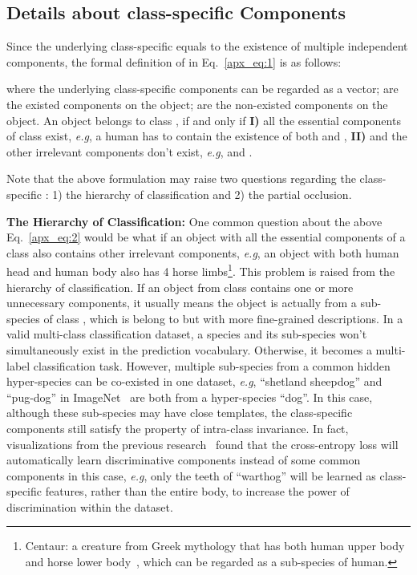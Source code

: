 \documentclass{article}
\def\eg{\emph{e.g}} \def\Eg{\emph{E.g}}
\begin{document}
\subsection{Details about class-specific Components}

Since the underlying class-specific  equals to the existence of multiple independent components, the formal definition of  in Eq.~\eqref{apx_eq:1} is as follows:

where the underlying class-specific components  can be regarded as a  vector;  are the existed components on the object;  are the non-existed components on the object. An object  belongs to class , if and only if \textbf{I)} all the essential components of class  exist, \eg, a human has to contain the existence of both  and , \textbf{II)} and the other irrelevant components don't exist, \eg,  and . 

Note that the above formulation may raise two questions regarding the class-specific : 1) the hierarchy of classification and 2) the partial occlusion.

\textbf{The Hierarchy of Classification:} One common question about the above Eq.~\eqref{apx_eq:2} would be what if an object with all the essential components of a class also contains other irrelevant components, \eg, an object with both human head and human body also has 4 horse limbs\footnote{Centaur: a creature from Greek mythology that has both human upper body and horse lower body~\cite{centaur}, which can be regarded as a sub-species of human.}. This problem is raised from the hierarchy of classification. If an object from class  contains one or more unnecessary components, it usually means the object is actually from a sub-species of class , which is belong to  but with more fine-grained descriptions. In a valid multi-class classification dataset, a species and its sub-species won't simultaneously exist in the prediction vocabulary. Otherwise, it becomes a multi-label classification task. However, multiple sub-species from a common hidden hyper-species can be co-existed in one dataset, \eg, ``shetland sheepdog'' and ``pug-dog'' in ImageNet~\cite{russakovsky2015imagenet} are both from a hyper-species ``dog''. In this case, although these sub-species may have close templates, the class-specific components  still satisfy the property of intra-class invariance. In fact, visualizations from the previous research~\cite{tang2020long} found that the cross-entropy loss will automatically learn discriminative components instead of some common components in this case, \eg, only the teeth of ``warthog'' will be learned as class-specific features, rather than the entire body, to increase the power of discrimination within the dataset.
\end{document}
